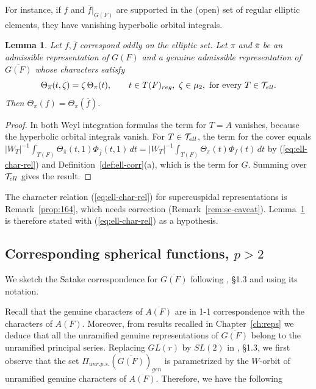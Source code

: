 \documentclass[12pt,letterpaper]{book}
\theoremstyle{plain}
\newtheorem{lemma}[theorem]{Lemma}
\theoremstyle{definition}
\theoremstyle{remark}
\theoremstyle{remark}
\begin{document}
For instance, if $f$ and $\overline{f}|_{G(F)}$ are supported in the
(open) set of regular elliptic elements, they have vanishing hyperbolic
orbital integrals.

\begin{lemma}\label{lem:ell-odd}
Let $f,\overline{f}$ correspond oddly on the elliptic set. Let $\pi$ and
$\overline{\pi}$ be an admissible representation of $G(F)$ and a genuine
admissible representation of $\overline{G(F)}$ whose characters satisfy
\begin{equation}\label{eq:ell-char-rel}
\Theta_{\overline{\pi}}(t,\zeta)=\zeta\,\Theta_\pi(t),\qquad
t\in T(F)_{reg},\ \zeta\in\mu_2,\ \text{for every }T\in{\cal T}_{ell}.
\end{equation}
Then $\Theta _{\pi }(f)=\Theta _{\overline{\pi }}(\overline{f})$.
\end{lemma}

\begin{proof}
In both Weyl integration formulas the term for $T=A$ vanishes, because
the hyperbolic orbital integrals vanish. For $T\in{\cal T}_{ell}$, the
term for the cover equals
$|W_T|^{-1}\int_{T(F)}\Theta_{\overline\pi}(t,1)\Phi_{\overline f}(t,1)\,dt
=|W_T|^{-1}\int_{T(F)}\Theta_{\pi}(t)\Phi_{f}(t)\,dt$ by
(\ref{eq:ell-char-rel}) and Definition~\ref{def:ell-corr}(a), which is
the term for $G$. Summing over ${\cal T}_{ell}$ gives the result.
\end{proof}

The character relation (\ref{eq:ell-char-rel}) for supercuspidal
representations is Remark~\ref{prop:164}, which needs correction
(Remark~\ref{rem:sc-caveat}). Lemma~\ref{lem:ell-odd} is therefore
stated with (\ref{eq:ell-char-rel}) as a hypothesis.

\subsection{Corresponding spherical functions, \texorpdfstring{$p> 2$}{p> 2}}\label{sec:spherical}

We sketch the Satake correspondence for $\overline{G(F)}$
following \cite{J}, \S 1.3 and using its notation.

Recall that the genuine characters of
$\overline{A(F)}$ are in 1-1 correspondence with
the characters of $A(F)$. Moreover, from results recalled in
Chapter~\ref{ch:reps} we deduce that all
the unramified genuine representations of
$\overline{G(F)}$ belong to the unramified principal series.
Replacing $GL(r)$ by
$SL(2)$ in \cite{J}, \S 1.3, we first observe that the
set $\Pi_{unr.p.s.}(\overline{G(F)})_{gen}$ is
parametrized by the $W$-orbit of unramified
genuine characters of $\overline{A(F)}$. Therefore, we have the following
\end{document}
